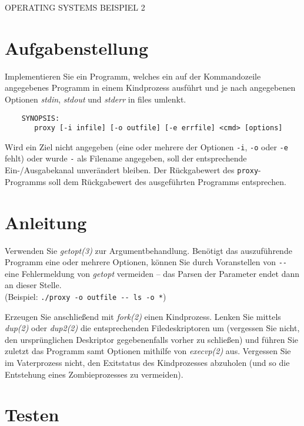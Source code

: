 \documentclass{article}
\begin{document}
\begin{center}
\begin{Large}
OPERATING SYSTEMS BEISPIEL 2
\end{Large}
\end{center}

\section*{Aufgabenstellung}

Implementieren Sie ein Programm, welches ein auf der Kommandozeile angegebenes
Programm in einem Kindprozess ausführt und je nach angegebenen Optionen 
\emph{stdin}, \emph{stdout} und \emph{stderr} in files umlenkt.

\begin{verbatim}
    SYNOPSIS:
       proxy [-i infile] [-o outfile] [-e errfile] <cmd> [options]
\end{verbatim}

Wird ein Ziel nicht angegeben (eine oder mehrere der Optionen \verb_-i_,
\verb_-o_ oder \verb_-e_ fehlt) oder wurde \verb_-_ als Filename angegeben, soll
der entsprechende Ein-/Ausgabekanal unverändert bleiben. Der Rückgabewert des
\verb_proxy_-Programms soll dem Rückgabewert des ausgeführten Programms
entsprechen.

\section*{Anleitung}

Verwenden Sie \emph{getopt(3)} zur Argumentbehandlung. Benötigt das
auszuführende Programm eine oder mehrere Optionen, können Sie durch Voranstellen
von \verb|--| eine Fehlermeldung von {\em getopt} vermeiden – das Parsen der
Parameter endet dann an dieser Stelle.\\
(Beispiel: \verb|./proxy -o outfile -- ls -o *|)

Erzeugen Sie anschließend mit \emph{fork(2)} einen Kindprozess. Lenken Sie
mittels \emph{dup(2)} oder \emph{dup2(2)} die entsprechenden Filedeskriptoren um
(vergessen Sie nicht, den ursprünglichen Deskriptor gegebenenfalls vorher zu
schließen) und führen Sie zuletzt das Programm samt Optionen mithilfe von
\emph{execvp(2)} aus. Vergessen Sie im Vaterprozess nicht, den Exitstatus des
Kindprozesses abzuholen (und so die Entstehung eines Zombieprozesses zu
vermeiden).

\section*{Testen}
\end{document}
